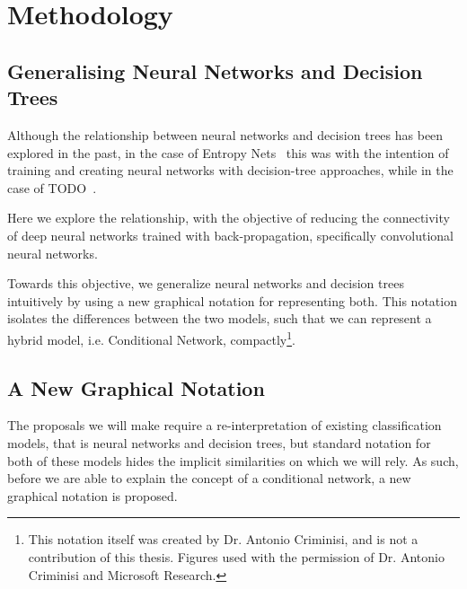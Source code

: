 \documentclass[thesis]{subfiles}
\begin{document}
\chapter{Methodology}
\label{methodology}
\ifpdf
    \graphicspath{{Figs/Raster/}{Figs/PDF/}{Figs/}}
\else
    \graphicspath{{Figs/Vector/}{Figs/}}
\fi

\section{Generalising Neural Networks and Decision Trees}
Although the relationship between neural networks and decision trees has been explored in the past, in the case of Entropy Nets~\cite{Sethi1990} this was with the intention of training and creating neural networks with decision-tree approaches, while in the case of TODO~\cite{Welbl2014casting}.

Here we explore the relationship, with the objective of reducing the connectivity of deep neural networks trained with back-propagation, specifically convolutional neural networks. 

Towards this objective, we generalize neural networks and decision trees intuitively by using a new graphical notation for representing both. This notation isolates the differences between the two models, such that we can represent a hybrid model, i.e. Conditional Network, compactly\footnote{This notation itself was created by Dr. Antonio Criminisi, and is not a contribution of this thesis. Figures used with the permission of Dr. Antonio Criminisi and Microsoft Research.}.

\section{A New Graphical Notation}
The proposals we will make require a re-interpretation of existing classification models, that is neural networks and decision trees, but standard notation for both of these models hides the implicit similarities on which we will rely. As such, before we are able to explain the concept of a conditional network, a new graphical notation is proposed.
\end{document}
